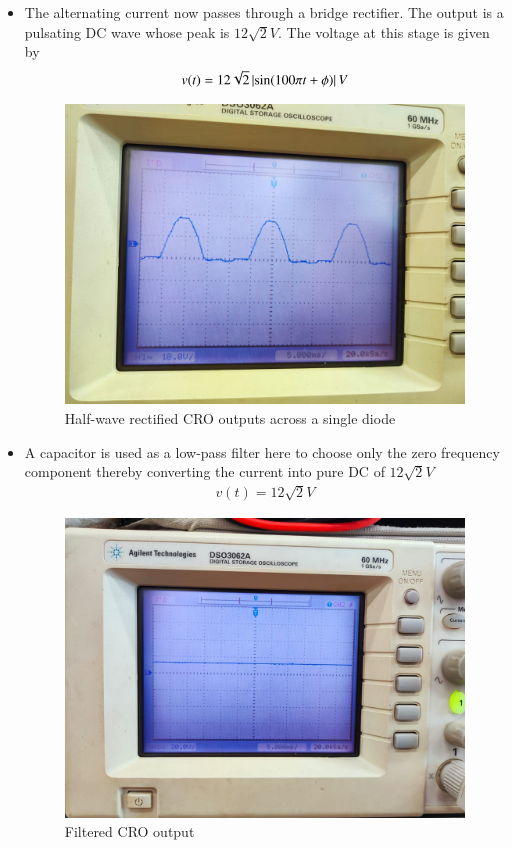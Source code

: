 \documentclass[journal,12pt,twocolumn]{IEEEtran}
\begin{document}
\begin{itemize}
	\item The alternating current now passes through a bridge rectifier. The output is a pulsating DC wave whose peak is $12\sqrt{2}V$. The voltage at this stage is given by
	\begin{align}
		v(t) = 12\sqrt{2}\left\vert\sin(100\pi t + \phi)\right\vert V
	\end{align}
	\begin{figure}[!ht]
		\centering
		\includegraphics[width=\columnwidth]{./figs/rectifier.jpeg}
		\caption{Half-wave rectified CRO outputs across a single diode}
		\label{fig-rectifier-2}	
	\end{figure}
	
	\item A capacitor is used as a low-pass filter here to choose only the zero frequency component thereby converting the current into pure DC of $12\sqrt{2}V$
	\begin{align}
		v(t) = 12\sqrt{2}V
	\end{align}
	\begin{figure}[!ht]
		\centering
		\includegraphics[width=\columnwidth]{./figs/filter.jpeg}
		\caption{Filtered CRO output}
		\label{fig-filter}	
	\end{figure}
	

\end{itemize}
\end{document}
